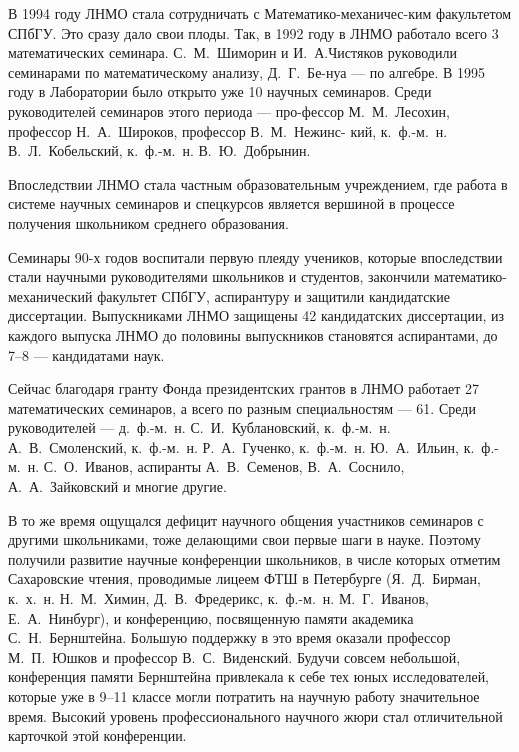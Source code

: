 \ms\abz В 1994 году ЛНМО стала сотрудничать с Математико-механичес-\linebreak ким факультетом СПбГУ. Это сразу дало свои плоды. Так, в 1992 году в ЛНМО работало всего 3 математических семинара. С.~М.~Шиморин и И.~А.\linebreak Чистяков руководили семинарами по математическому анализу, Д.~Г.~Бе-\linebreak нуа — по алгебре. В 1995 году в Лаборатории было открыто уже 10 научных семинаров. Среди руководителей семинаров этого периода — про-\linebreak фессор М.~М.~Лесохин, профессор Н.~А.~Широков, профессор В.~М.~Нежинс- кий, к.~ф.-м.~н. В.~Л.~Кобельский, к.~ф.-м.~н. В.~Ю.~Добрынин.

\ms\abz Впоследствии ЛНМО стала частным образовательным учреждением, где работа в системе научных семинаров и спецкурсов является вершиной в процессе получения школьником среднего образования. 

\ms\abz Семинары 90-х годов воспитали первую плеяду учеников, которые впоследствии стали научными руководителями школьников и студентов, закончили математико-механический факультет СПбГУ, аспирантуру и защитили кандидатские диссертации. Выпускниками ЛНМО защищены 42 кандидатских диссертации, из каждого выпуска ЛНМО до половины выпускников становятся аспирантами, до 7–8 — кандидатами наук.

\ms\abz Сейчас благодаря гранту Фонда президентских грантов в ЛНМО работает 27 математических семинаров, а всего по разным специальностям — 61. Среди руководителей — д.~ф.-м.~н. С.~И.~Кублановский, к.~ф.-м.~н. А.~В.~Смоленский, к.~ф.-м.~н. Р.~А.~Гученко, к.~ф.-м.~н. Ю.~А.~Ильин, к.~ф.-м.~н. С.~О.~Иванов, аспиранты А.~В.~Семенов, В.~А.~Соснило, А.~А.~Зайковский и многие другие. 

\ms\abz В то же время ощущался дефицит научного общения участников семинаров с другими школьниками, тоже делающими свои первые шаги в науке. Поэтому получили развитие научные конференции школьников, в числе которых отметим Сахаровские чтения, проводимые лицеем ФТШ в Петербурге (Я.~Д.~Бирман, к.~х.~н. Н.~М.~Химин, Д.~В.~Фредерикс, к.~ф.-м.~н. М.~Г.~Иванов, Е.~А.~Нинбург), и конференцию, посвященную памяти академика С.~Н.~Бернштейна. Большую поддержку в это время оказали профессор М.~П.~Юшков и профессор В.~С.~Виденский. Будучи совсем небольшой, конференция памяти Бернштейна привлекала к себе тех юных исследователей, которые уже в 9–11 классе могли потратить на научную работу значительное время. Высокий уровень профессионального научного жюри стал отличительной карточкой этой конференции.

